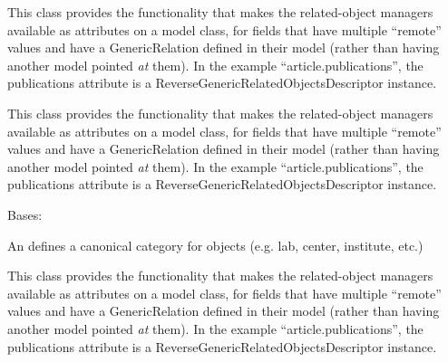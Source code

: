 \documentclass[letterpaper,10pt,english]{sphinxmanual}
\begin{document}
\begin{fulllineitems}
\begin{fulllineitems}
\label{generated/apps.profiles.models:apps.profiles.models.Organization.meetings}
This class provides the functionality that makes the related-object
managers available as attributes on a model class, for fields that have
multiple ``remote'' values and have a GenericRelation defined in their model
(rather than having another model pointed \emph{at} them). In the example
``article.publications'', the publications attribute is a
ReverseGenericRelatedObjectsDescriptor instance.

\end{fulllineitems}



\begin{fulllineitems}
\label{generated/apps.profiles.models:apps.profiles.models.Organization.unit_permissions}
This class provides the functionality that makes the related-object
managers available as attributes on a model class, for fields that have
multiple ``remote'' values and have a GenericRelation defined in their model
(rather than having another model pointed \emph{at} them). In the example
``article.publications'', the publications attribute is a
ReverseGenericRelatedObjectsDescriptor instance.

\end{fulllineitems}


\end{fulllineitems}



\begin{fulllineitems}
\label{generated/apps.profiles.models:apps.profiles.models.OrganizationType}
Bases: {\hyperref[generated/apps.profiles.models:apps.profiles.models.BaseModel]{}}

An  defines a canonical category for 
objects (e.g. lab, center, institute, etc.)


\begin{fulllineitems}
\label{generated/apps.profiles.models:apps.profiles.models.OrganizationType.unit_permissions}
This class provides the functionality that makes the related-object
managers available as attributes on a model class, for fields that have
multiple ``remote'' values and have a GenericRelation defined in their model
(rather than having another model pointed \emph{at} them). In the example
``article.publications'', the publications attribute is a
ReverseGenericRelatedObjectsDescriptor instance.

\end{fulllineitems}


\end{fulllineitems}
\end{document}
